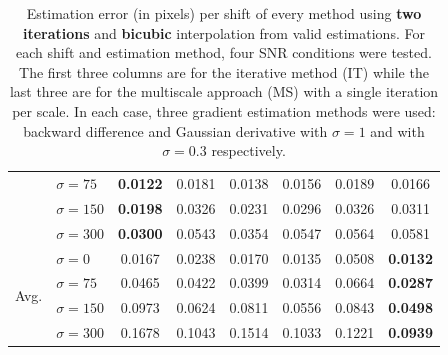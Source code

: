 \begin{table}[h!]
\begin{tabular}{c |l||c|c|c|c|c|c}
 & $\sigma=75$ & \textbf{0.0122} & 0.0181 & 0.0138 & 0.0156 & 0.0189 & 0.0166 \\ 
 & $\sigma=150$ & \textbf{0.0198} & 0.0326 & 0.0231 & 0.0296 & 0.0326 & 0.0311 \\ 
 & $\sigma=300$ & \textbf{0.0300} & 0.0543 & 0.0354 & 0.0547 & 0.0564 & 0.0581 \\ 
 \hline
\hline
\multirow{4}{*}{Avg.} & $\sigma=0$ & 0.0167 & 0.0238 & 0.0170 & 0.0135 & 0.0508 & \textbf{0.0132} \\ 
 & $\sigma=75$ & 0.0465 & 0.0422 & 0.0399 & 0.0314 & 0.0664 & \textbf{0.0287} \\ 
 & $\sigma=150$ & 0.0973 & 0.0624 & 0.0811 & 0.0556 & 0.0843 & \textbf{0.0498} \\ 
 & $\sigma=300$ & 0.1678 & 0.1043 & 0.1514 & 0.1033 & 0.1221 & \textbf{0.0939} \\ 
\hline
\end{tabular}
	\caption{\small{Estimation error (in pixels) per shift of every method using \textbf{two iterations} and \textbf{bicubic} interpolation from valid estimations. For each shift and estimation method, four SNR conditions were tested. The first three columns are for the iterative method (IT) while the last three are for the multiscale approach (MS) with a single iteration per scale. In each case, three gradient estimation methods were used: backward difference and Gaussian derivative with $\sigma=1$ and with $\sigma=0.3$ respectively.}}
	\label{tab:table1}
\end{table}
